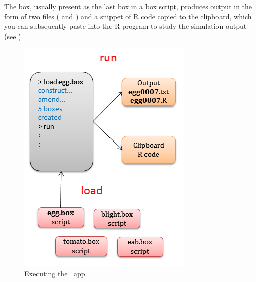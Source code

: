 The  box, usually present as the last box in a box script, produces output in the form of two files ( and ) and a snippet of R code copied to the clipboard, which you can subsquently paste into the R program to study the simulation output (see ).


\begin{figure}
\centering
\includegraphics[scale=0.8]{graphics/workflow-execute}
\caption{Executing the \US\ app.}
\label{fig:workflow-execute}
\end{figure}

